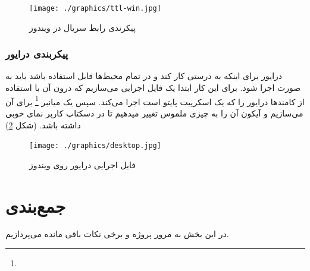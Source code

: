 \documentclass{article}
\begin{document}
\begin{figure}
	\centering
	\texttt{[image: ./graphics/ttl-win.jpg]}
	\caption{پیکرندی رابط سریال در ویندوز}
	\label{ttl-win}
\end{figure}

\subsubsection{پیکربندی درایور}
درایور برای اینکه به درستی کار کند و در تمام محیط‌ها قابل استفاده باشد باید به صورت 
 اجرا شود. برای این کار ابتدا یک فایل اجرایی می‌سازیم که درون آن با استفاده از کامند‌ها درایور را که یک اسکرپیت پایتو است اجرا می‌کند. سپس یک میانبر \footnote{} برای آن می‌سازیم و آیکون آن را به چیزی ملموس تغییر میدهیم تا در دسکتاپ کاربر نمای خوبی داشته باشد. (شکل \ref{desktop})

\begin{figure}
	\centering
	\texttt{[image: ./graphics/desktop.jpg]}
	\caption{فایل اجرایی درایور روی ویندوز}
	\label{desktop}
\end{figure}

\section{جمع‌بندی}
در این بخش به مرور پروژه و برخی نکات باقی مانده می‌پردازیم.
\end{document}
